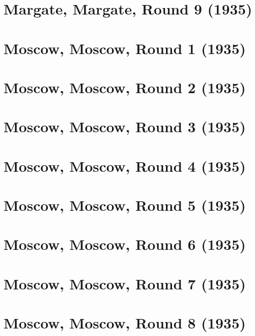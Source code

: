 \documentclass[11pt]{article}
\begin{document}
\section{Margate, Margate, Round 9 (1935)}


\clearpage

\section{Moscow, Moscow, Round 1 (1935)}


\clearpage

\section{Moscow, Moscow, Round 2 (1935)}


\clearpage

\section{Moscow, Moscow, Round 3 (1935)}


\clearpage

\section{Moscow, Moscow, Round 4 (1935)}


\clearpage

\section{Moscow, Moscow, Round 5 (1935)}


\clearpage

\section{Moscow, Moscow, Round 6 (1935)}


\clearpage

\section{Moscow, Moscow, Round 7 (1935)}


\clearpage

\section{Moscow, Moscow, Round 8 (1935)}

\end{document}
